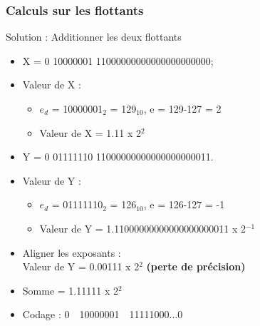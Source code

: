 \documentclass{beamer}
\begin{document}
\begin{frame}
	\frametitle{Calculs sur les flottants}
	
	\begin{block}{Solution : Additionner les deux flottants}
		\begin{itemize}
			\item X = 0 10000001 11000000000000000000000;
			\item Valeur de X :
			\begin{itemize}
				\item $e_d$ = 10000001$_2$ = 129$_{10}$, e = 129-127 = 2
				\item Valeur de X = 1.11 x 2$^2$
			\end{itemize}
			
			\item Y = 0 01111110 11000000000000000000011.
			\item Valeur de Y :
			\begin{itemize}
				\item $e_d$ = 01111110$_2$ = 126$_{10}$, e = 126-127 = -1
				\item Valeur de Y = 1.11000000000000000000011 x 2$^{-1}$
			\end{itemize}
			\item Aligner les exposants :\\ Valeur de Y = 0.00111 x 2$^2$
			\textbf{(perte de précision)}
			\item Somme = 1.11111 x 2$^2$
			\item Codage : 0~~10000001~~11111000...0
		\end{itemize}
	\end{block}
\end{frame}
\end{document}
